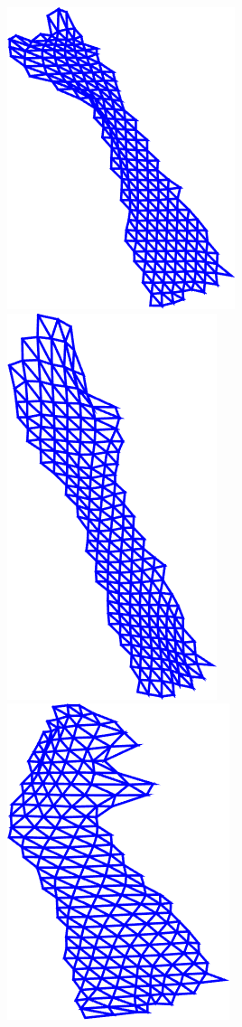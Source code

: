 \begin{figure}
    \includegraphics[height=\flowh]{resources/Annotation_Correction/Fig_Flows/4}
    \includegraphics[height=\flowh]{resources/Annotation_Correction/Fig_Flows/5}
    \includegraphics[height=\flowh]{resources/Annotation_Correction/Fig_Flows/6}

\end{figure}
